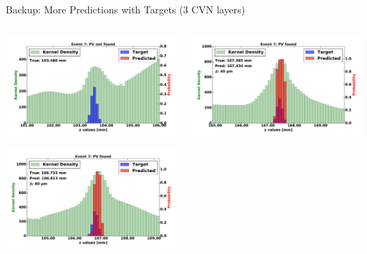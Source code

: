 \begin{frame}{Backup: More Predictions with Targets (3 CVN layers)}
  \begin{columns}[c]
        \begin{center}
            \includegraphics[width=1\textwidth,height=0.45\textwidth, trim=18 0 18 0]{images/120000_3layer_45.pdf}
    
            \includegraphics[width=1\textwidth, height=0.45\textwidth,trim=18 0 18 0]{images/120000_3layer_46.pdf}

        \end{center}
        \begin{center}
           \includegraphics[width=1\textwidth, height=0.45\textwidth, trim=18 0 18 0]{images/120000_3layer_47.pdf}
    

\end{center}
\end{columns}
\end{frame}
